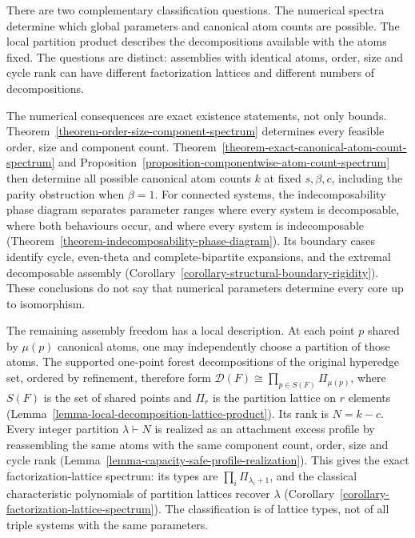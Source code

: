 \documentclass[a4paper,11pt,reqno]{amsart}
\theoremstyle{plain}
\theoremstyle{definition}
\theoremstyle{remark}
\begin{document}
There are two complementary classification questions.  The numerical
spectra determine which global parameters and canonical atom counts are
possible.  The local partition product describes the decompositions
available with the atoms fixed.  The questions are distinct: assemblies
with identical atoms, order, size and cycle rank can have different
factorization lattices and different numbers of decompositions.

The numerical consequences are exact existence statements, not only bounds.
Theorem~\ref{theorem-order-size-component-spectrum} determines every feasible
order, size and component count.
Theorem~\ref{theorem-exact-canonical-atom-count-spectrum} and
Proposition~\ref{proposition-componentwise-atom-count-spectrum} then determine
all possible canonical atom counts \(k\) at fixed \(s,\beta,c\), including
the parity obstruction when \(\beta=1\).  For connected systems, the
indecomposability phase diagram
separates parameter ranges where every system is decomposable, where both
behaviours occur, and where every system is indecomposable
(Theorem~\ref{theorem-indecomposability-phase-diagram}).  Its boundary cases
identify cycle, even-theta and complete-bipartite expansions, and the
extremal decomposable assembly
(Corollary~\ref{corollary-structural-boundary-rigidity}).  These conclusions
do not say that numerical parameters determine every core up to isomorphism.

The remaining assembly freedom has a local description.  At each point
\(p\) shared by \(\mu(p)\) canonical atoms, one may independently choose a
partition of those atoms.  The supported one-point
forest decompositions of the original hyperedge set, ordered by refinement,
therefore form \(\mathcal D(F)\cong\prod_{p\in S(F)}\Pi_{\mu(p)}\), where
\(S(F)\) is the set of shared points and \(\Pi_r\) is the partition lattice
on \(r\) elements (Lemma~\ref{lemma-local-decomposition-lattice-product}).
Its rank is \(N=k-c\).  Every integer partition \(\lambda\vdash N\) is
realized as an attachment excess profile by reassembling the same atoms
with the same component count, order, size and cycle rank
(Lemma~\ref{lemma-capacity-safe-profile-realization}).  This gives the exact
factorization-lattice spectrum: its types are
\(\prod_i\Pi_{\lambda_i+1}\), and the classical characteristic polynomials
of partition lattices \citep[Chapter~3]{stanley2012} recover \(\lambda\)
(Corollary~\ref{corollary-factorization-lattice-spectrum}).  The classification
is of lattice types,
not of all triple systems with the same parameters.
\end{document}
